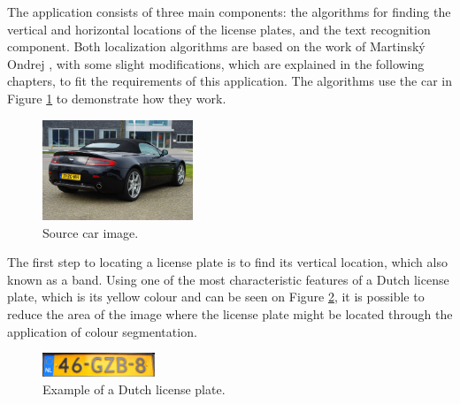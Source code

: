 
The application consists of three main components: the algorithms for finding the vertical and horizontal locations of the license plates, and the text recognition component. Both localization algorithms are based on the work of Martinský Ondrej \cite{ondrej2007algorithmic}, with some slight modifications, which are explained in the following chapters, to fit the requirements of this application. 
The algorithms use the car in Figure \ref{fig:car-source} to demonstrate how they work.

\begin{figure}[ht]
    \centering
    \includegraphics[width=0.40\textwidth]{plaatjes/car}
    \caption{Source car image. \cite{source-car-fig}}
    \label{fig:car-source}
\end{figure}%


The first step to locating a license plate is to find its vertical location, which also known as a band. Using one of the most characteristic features of a Dutch license plate, which is its yellow colour and can be seen on Figure \ref{fig:dutch-plate}, it is possible to reduce the area of the image where the license plate might be located through the application of colour segmentation. 

\begin{figure}[ht]
    \centering
    \includegraphics[width=0.3\textwidth]{plaatjes/dutch-plate}
    \caption{Example of a Dutch license plate. \cite{dutch-license-fig}}
    \label{fig:dutch-plate}
\end{figure}

